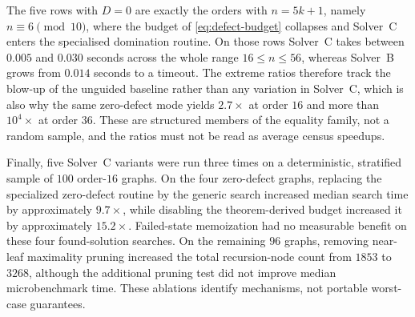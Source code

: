 \documentclass[smallextended,natbib,nospthms]{svjour3}
\theoremstyle{definition}
\theoremstyle{remark}
\begin{document}
The five rows with $D=0$ are exactly the orders with $n=5k+1$, namely
$n\equiv 6\pmod{10}$, where the budget of \eqref{eq:defect-budget} collapses
and Solver~C enters the specialised domination routine. On those rows
Solver~C takes between $0.005$ and $0.030$ seconds across the whole range
$16\leq n\leq 56$, whereas Solver~B grows from $0.014$ seconds to a timeout.
The extreme ratios therefore track the blow-up of the unguided baseline rather
than any variation in Solver~C, which is also why the same zero-defect mode
yields $2.7\times$ at order $16$ and more than $10^4\times$ at order $36$.
These are structured members of the equality family, not a random sample, and
the ratios must not be read as average census speedups.

Finally, five Solver~C variants were run three times on a deterministic,
stratified sample of $100$ order-$16$ graphs. On the four zero-defect graphs,
replacing the specialized zero-defect routine by the generic search increased
median search time by approximately $9.7\times$, while disabling the
theorem-derived budget increased it by approximately $15.2\times$. Failed-state
memoization had no measurable benefit on these four found-solution searches.
On the remaining $96$ graphs, removing near-leaf maximality pruning increased
the total recursion-node count from $1853$ to $3268$, although the additional
pruning test did not improve median microbenchmark time. These ablations
identify mechanisms, not portable worst-case guarantees.
\end{document}
